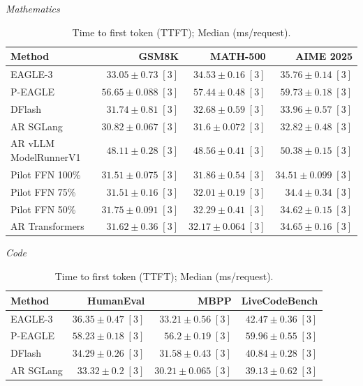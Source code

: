 \documentclass[conference,onecolumn]{IEEEtran}
\begin{document}
\begin{table}[!htp]
\centering\small
\setlength{\tabcolsep}{3pt}
\caption{Time to first token (TTFT); Median (ms/request).}
\label{tab:appendix-metric-ttft-median-none}
\textit{Mathematics}\par\smallskip
\begin{tabular}{@{}>{\raggedright\arraybackslash}p{3.7cm}rrr@{}}
\toprule
Method & GSM8K & MATH-500 & AIME 2025 \\
\midrule
EAGLE-3 & \(33.05 \pm 0.73\;[3]\) & \(34.53 \pm 0.16\;[3]\) & \(35.76 \pm 0.14\;[3]\) \\
P-EAGLE & \(56.65 \pm 0.088\;[3]\) & \(57.44 \pm 0.48\;[3]\) & \(59.73 \pm 0.18\;[3]\) \\
DFlash & \(31.74 \pm 0.81\;[3]\) & \(32.68 \pm 0.59\;[3]\) & \(33.96 \pm 0.57\;[3]\) \\
AR \textperiodcentered{} SGLang & \(\mathbf{30.82} \pm 0.067\;[3]\) & \(\mathbf{31.6} \pm 0.072\;[3]\) & \(\mathbf{32.82} \pm 0.48\;[3]\) \\
AR \textperiodcentered{} vLLM ModelRunnerV1 & \(48.11 \pm 0.28\;[3]\) & \(48.56 \pm 0.41\;[3]\) & \(50.38 \pm 0.15\;[3]\) \\
Pilot FFN 100\% & \(31.51 \pm 0.075\;[3]\) & \(31.86 \pm 0.54\;[3]\) & \(34.51 \pm 0.099\;[3]\) \\
Pilot FFN 75\% & \(31.51 \pm 0.16\;[3]\) & \(32.01 \pm 0.19\;[3]\) & \(34.4 \pm 0.34\;[3]\) \\
Pilot FFN 50\% & \(31.75 \pm 0.091\;[3]\) & \(32.29 \pm 0.41\;[3]\) & \(34.62 \pm 0.15\;[3]\) \\
AR \textperiodcentered{} Transformers & \(31.62 \pm 0.36\;[3]\) & \(32.17 \pm 0.064\;[3]\) & \(34.65 \pm 0.16\;[3]\) \\
\bottomrule
\end{tabular}\par\medskip
\textit{Code}\par\smallskip
\begin{tabular}{@{}>{\raggedright\arraybackslash}p{3.7cm}rrr@{}}
\toprule
Method & HumanEval & MBPP & LiveCodeBench \\
\midrule
EAGLE-3 & \(36.35 \pm 0.47\;[3]\) & \(33.21 \pm 0.56\;[3]\) & \(42.47 \pm 0.36\;[3]\) \\
P-EAGLE & \(58.23 \pm 0.18\;[3]\) & \(56.2 \pm 0.19\;[3]\) & \(59.96 \pm 0.55\;[3]\) \\
DFlash & \(34.29 \pm 0.26\;[3]\) & \(31.58 \pm 0.43\;[3]\) & \(40.84 \pm 0.28\;[3]\) \\
AR \textperiodcentered{} SGLang & \(\mathbf{33.32} \pm 0.2\;[3]\) & \(\mathbf{30.21} \pm 0.065\;[3]\) & \(\mathbf{39.13} \pm 0.62\;[3]\) \\

\end{tabular}
\end{table}
\end{document}
